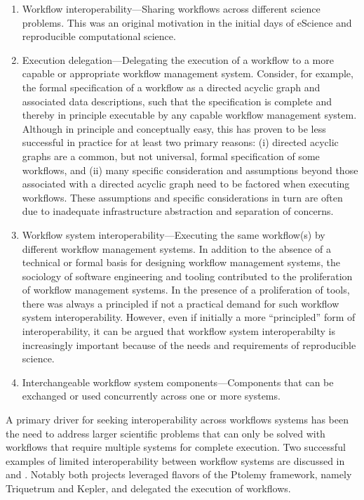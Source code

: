 \begin{enumerate}

\item Workflow interoperability---Sharing workflows across different science
problems. This was an original motivation in the initial days of eScience  and
reproducible computational science. 

\item Execution delegation---Delegating the execution of a workflow to a more
capable or appropriate workflow management system. Consider, for example, the
formal specification of a workflow as a directed acyclic graph and associated
data descriptions, such that the specification is complete and thereby in
principle executable by any capable workflow management system.  Although in
principle and conceptually easy, this has proven to be less successful in
practice for at least two primary reasons: (i) directed acyclic graphs are a
common, but not universal, formal specification of some workflows, and (ii)
many specific consideration and assumptions beyond those associated with a
directed acyclic graph need to be factored when executing workflows. These
assumptions and specific considerations in turn are often due to inadequate
infrastructure abstraction and separation of concerns.

\item Workflow system interoperability---Executing the same workflow(s) by
different workflow management systems. In addition to the absence of a
technical or formal basis for designing workflow management systems, the
sociology of software engineering and tooling contributed to the proliferation
of workflow management systems. In the presence of a proliferation of tools,
there was always a principled if not a practical demand for such workflow
system interoperability. However, even if initially a  more  ``principled'' form
of interoperability, it can be argued that workflow system interoperabilty is
increasingly important because of the needs and requirements of reproducible
science.

\item Interchangeable workflow system components---Components that can be
exchanged or used concurrently across one or more systems. 

\end{enumerate} 

A primary driver for seeking interoperability across workflows systems
has been the need to address larger scientific problems that can only be
solved with workflows that require multiple systems for complete execution.
Two successful examples of limited interoperability between workflow systems
are discussed in \cite{brooks_triquetrum:_2015} and
\cite{mandal_integrating_2007}. Notably both projects leveraged flavors of
the Ptolemy framework, namely Triquetrum and Kepler, and delegated the
execution of workflows. 






